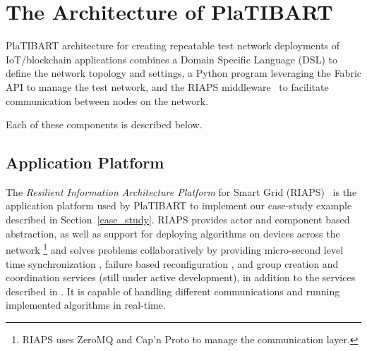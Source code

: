 \section{The Architecture of PlaTIBART}
\label{proposedArch}

PlaTIBART architecture for creating repeatable test network deployments of IoT/blockchain applications combines a Domain Specific Language (DSL) to define the network topology and settings, a Python program leveraging the Fabric API to manage the test network, and the RIAPS middleware~\cite{RIAPS_IEEE_ISORC_2017} to facilitate communication between nodes on the network. 
\iffalse
PlaTIBART's DSL is textual and uses the JSON formatting for notation. The network manager application leverages the usage of SSH via the Python Fabric API to allow remote management of potentially multiple nodes on each host in the network. The RIAPS middleware provides each node on the network the off-blockchain communication mechanism to communicate with other nodes and contains the application logic for each node. 
\fi
Each of these components is described below.

\subsection{Application Platform}


The \textit{Resilient Information Architecture Platform} for Smart Grid (RIAPS)~\cite{RIAPS_IEEE_ISORC_2017} is the application platform used by PlaTIBART to implement our case-study example described in Section~\ref{case_study}. %
RIAPS provides actor and component based abstraction, as well as support for deploying algorithms on devices across the network \footnote{RIAPS uses ZeroMQ \cite{hintjens2010zeromq} and Cap'n Proto \cite{varda2015cap} to manage the communication layer.} and solves problems collaboratively by providing micro-second level time synchronization \cite{RIAPS_IEEE_ISORC_2017}, failure based reconfiguration \cite{dubey2017resilience}, and group creation and coordination services (still under active development), in addition to the services described in \cite{LeeNiddodiSrivastavaBakken2016}. It is capable of handling different communications and running implemented algorithms in real-time.

